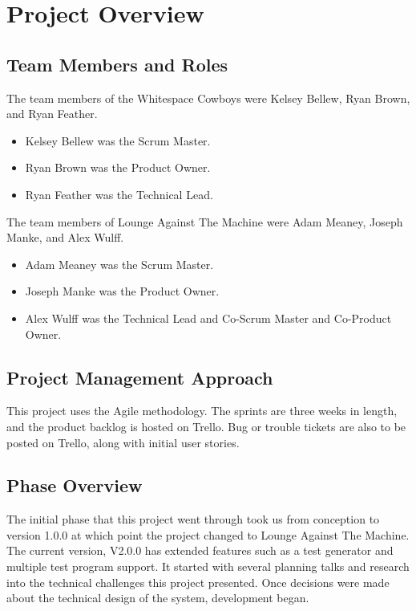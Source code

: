 

\chapter{Project Overview}


\section{Team Members and Roles}
The team members of the Whitespace Cowboys were Kelsey Bellew, Ryan Brown, and Ryan Feather. 

\begin{itemize}
\item Kelsey Bellew was the Scrum Master.
\item Ryan Brown was the Product Owner.
\item Ryan Feather was the Technical Lead.
\end{itemize}

The team members of Lounge Against The Machine were Adam Meaney, Joseph Manke, and Alex Wulff.

\begin{itemize}
\item Adam Meaney was the Scrum Master.
\item Joseph Manke was the Product Owner.
\item Alex Wulff was the Technical Lead and Co-Scrum Master and Co-Product Owner.
\end{itemize}


\section{Project  Management Approach}
This project uses the Agile methodology. The sprints are three weeks in length, and the product backlog is hosted on Trello. Bug or trouble tickets are also to be posted on Trello, along with initial user stories. 


\section{Phase  Overview}
The initial phase that this project went through took us from conception to version 1.0.0 at which point the project changed to Lounge Against The Machine.  The current version, V2.0.0 has extended features such as a test generator and multiple test program support. It started with several planning talks and research into the technical challenges this project presented. Once decisions were made about the technical design of the system, development began.


